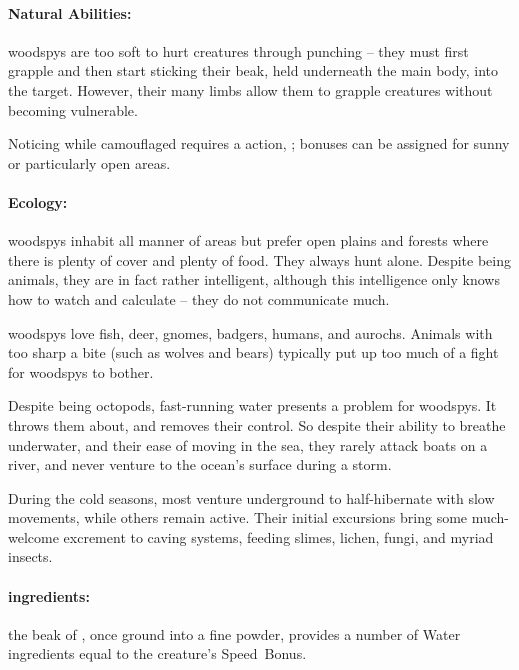 \begin{multicols}{2}
\paragraph{Natural Abilities:} \glspl{woodspy} are too soft to hurt creatures through punching -- they must first grapple and then start sticking their beak, held underneath the main body, into the target.
However, their many limbs allow them to grapple creatures without becoming vulnerable.%

Noticing  while camouflaged requires a  action, \tn[14]; bonuses can be assigned for sunny or particularly open areas.

\woodspy

\paragraph{Ecology:} \Glspl{woodspy} inhabit all manner of areas but prefer open plains and forests where there is plenty of cover and plenty of food.  They always hunt alone.  Despite being animals, they are in fact rather intelligent, although this intelligence only knows how to watch and calculate -- they do not communicate much.

\Glspl{woodspy} love fish, deer, gnomes, badgers, humans, and aurochs.
Animals with too sharp a bite (such as wolves and bears) typically put up too much of a fight for \glspl{woodspy} to bother.

Despite being octopods, fast-running water presents a problem for \glspl{woodspy}.
It throws them about, and removes their control.
So despite their ability to breathe underwater, and their ease of moving in the sea, they rarely attack boats on a river, and never venture to the ocean's surface during a storm.

During the cold seasons, most venture underground to half-hibernate with slow movements, while others remain active.
Their initial excursions bring some much-welcome excrement to caving systems, feeding slimes, lichen, fungi, and myriad insects.

\paragraph{\Glspl{ingredient}:}
the beak of , once ground into a fine powder, provides a number of Water \glspl{ingredient} equal to the creature's Speed~Bonus.


\end{multicols}
